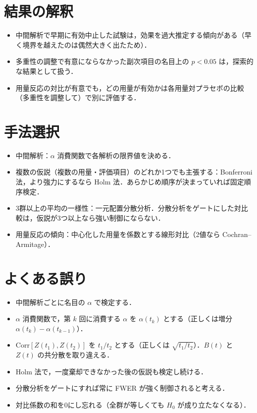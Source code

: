 \documentclass[a4paper,11pt,openany]{ltjsbook}
\newcommand{\Corr}{\mathrm{Corr}}
\begin{document}
\section{結果の解釈}\label{sec:14-interp}
\begin{itemize}
\item 中間解析で早期に有効中止した試験は，効果を過大推定する傾向がある（早く境界を越えたのは偶然大きく出たため）．
\item 多重性の調整で有意にならなかった副次項目の名目上の $p<0.05$ は，探索的な結果として扱う．
\item 用量反応の対比が有意でも，どの用量が有効かは各用量対プラセボの比較（多重性を調整して）で別に評価する．
\end{itemize}

\section{手法選択}\label{sec:14-choice}
\begin{itemize}
\item 中間解析：$\alpha$ 消費関数で各解析の限界値を決める．
\item 複数の仮説（複数の用量・評価項目）のどれか1つでも主張する：Bonferroni 法，より強力にするなら Holm 法．あらかじめ順序が決まっていれば固定順序検定．
\item 3群以上の平均の一様性：一元配置分散分析．分散分析をゲートにした対比較は，仮説が3つ以上なら強い制御にならない．
\item 用量反応の傾向：中心化した用量を係数とする線形対比（2値なら Cochran--Armitage）．
\end{itemize}

\section{よくある誤り}\label{sec:14-err}
\begin{warnbox}
\begin{itemize}
\item 中間解析ごとに名目の $\alpha$ で検定する．
\item $\alpha$ 消費関数で，第 $k$ 回に消費する $\alpha$ を $\alpha(t_k)$ とする（正しくは増分 $\alpha(t_k)-\alpha(t_{k-1})$）．
\item $\Corr[Z(t_1),Z(t_2)]$ を $t_1/t_2$ とする（正しくは $\sqrt{t_1/t_2}$）．$B(t)$ と $Z(t)$ の共分散を取り違える．
\item Holm 法で，一度棄却できなかった後の仮説も検定し続ける．
\item 分散分析をゲートにすれば常に FWER が強く制御されると考える．
\item 対比係数の和を0にし忘れる（全群が等しくても $H_0$ が成り立たなくなる）．
\end{itemize}
\end{warnbox}
\end{document}
